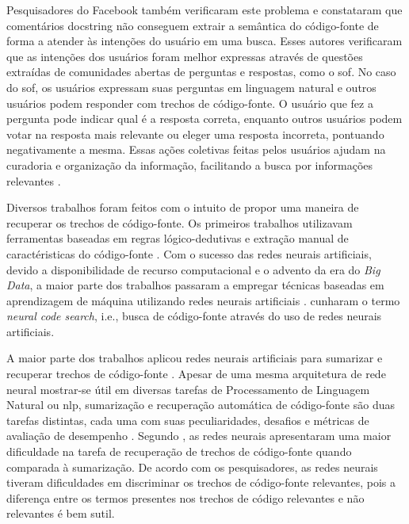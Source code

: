 Pesquisadores do Facebook \citep{cambronero-deep-learning-code-search:2019} também verificaram este problema e constataram que comentários \gls{docstring} não conseguem extrair a semântica do código-fonte de forma a atender às intenções do usuário em uma busca. Esses autores verificaram que as intenções dos usuários foram melhor expressas através de questões extraídas de comunidades abertas de perguntas e respostas, como o \gls{sof}. No caso do \Gls{sof}, os usuários expressam suas perguntas em linguagem natural e outros usuários podem responder com trechos de código-fonte. O usuário que fez a pergunta pode indicar qual é a resposta correta, enquanto outros usuários podem votar na resposta mais relevante ou eleger uma resposta incorreta, pontuando negativamente a mesma. Essas ações coletivas feitas pelos usuários ajudam na curadoria e organização da informação, facilitando a busca por informações relevantes \citep{Wang-quora:2013, cambronero-deep-learning-code-search:2019}. 


Diversos trabalhos foram feitos com o intuito de propor uma maneira de recuperar os trechos de código-fonte. Os primeiros trabalhos utilizavam ferramentas baseadas em regras lógico-dedutivas e extração manual de caractéristicas do código-fonte \citep{Allamanis:2018:SML}. Com o sucesso das redes neurais artificiais, devido a disponibilidade de recurso computacional e o advento da era do \textit{Big Data}, a maior parte dos trabalhos passaram a empregar técnicas baseadas em aprendizagem de máquina utilizando redes neurais artificiais \citep{Gu-deep-code-search:2018, yao-2018, iyer-etal-2016-summarizing, Allamanis-bimodal-source-code-natural-language:2015, Chen-bi-variational-autoencoder:2018, Sachdev-neural-code-search:2018, cambronero-deep-learning-code-search:2019}. \cite{cambronero-deep-learning-code-search:2019} cunharam o termo \textit{neural code search}, i.e., busca de código-fonte através do uso de redes neurais artificiais.

A maior parte dos trabalhos aplicou redes neurais artificiais para sumarizar e recuperar trechos de código-fonte \citep{iyer-etal-2016-summarizing, Allamanis-bimodal-source-code-natural-language:2015, Chen-bi-variational-autoencoder:2018}. Apesar de uma mesma arquitetura de rede neural mostrar-se 
útil em diversas tarefas de Processamento de Linguagem Natural ou \acrfull{nlp}, sumarização e recuperação automática de código-fonte são duas tarefas distintas, cada uma com suas peculiaridades, desafios e métricas de avaliação de desempenho \citep{allahyari-text-summarization-2017}. Segundo \cite{Allamanis-bimodal-source-code-natural-language:2015}, as redes neurais apresentaram uma maior dificuldade na tarefa de recuperação de trechos de código-fonte quando comparada à sumarização. De acordo com os pesquisadores, as redes neurais tiveram dificuldades em discriminar os trechos de código-fonte relevantes, pois a diferença entre os termos presentes nos trechos de código relevantes e não relevantes é bem sutil.

